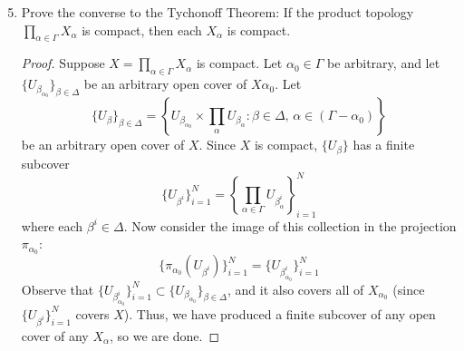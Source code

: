 \documentclass[letterpaper]{article}
\newcommand{\arbprod}[1]{\prod\limits_{\alpha\in\Gamma}#1_\alpha}
\begin{document}
\begin{enumerate}
\setcounter{enumi}{4}
\item Prove the converse to the Tychonoff Theorem: If the product topology $\arbprod{X}$ is compact, then each $X_\alpha$ is compact. 
\begin{proof}
Suppose $X=\arbprod{X}$ is compact. Let $\alpha_0\in\Gamma$ be arbitrary, and let $\{U_{\beta_{\alpha_0}}\}_{\beta\in\Delta}$ be an arbitrary open cover of $X{\alpha_0}$. Let
$$\{U_\beta\}_{\beta\in\Delta}=\left\lbrace U_{\beta_{\alpha_0}}\times\prod\limits_{\alpha}U_{\beta_\alpha} : \beta\in\Delta, \, \alpha\in(\Gamma-\alpha_0)\right\rbrace$$ 
be an arbitrary open cover of $X$. Since $X$ is compact, $\{U_\beta\}$ has a finite subcover 
$$\{U_{\beta^i}\}_{i=1}^N = \left\lbrace\prod\limits_{\alpha\in\Gamma}U_{\beta^i_\alpha}\right\rbrace_{i=1}^N$$ 
where each $\beta^i\in\Delta$. Now consider the image of this collection in the projection $\pi_{\alpha_0}$:
$$\{\pi_{\alpha_0}\left(U_{\beta^i}\right)\}_{i=1}^N = \{ U_{\beta^i_{\alpha_0}}\}_{i=1}^N$$
Observe that $\{ U_{\beta^i_{\alpha_0}}\}_{i=1}^N \subset \{U_{\beta_{\alpha_0}}\}_{\beta\in\Delta}$, and it also covers all of $X_{\alpha_0}$ (since $\{U_{\beta^i}\}_{i=1}^N$ covers $X$). Thus, we have produced a finite subcover of any open cover of any $X_\alpha$, so we are done. 
\end{proof}

\end{enumerate}
\end{document}
